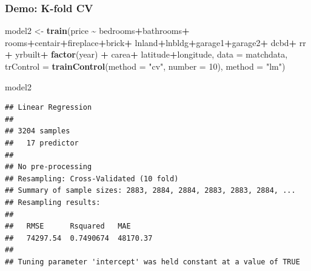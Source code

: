\documentclass[
  shownotes,
  xcolor={svgnames},
  hyperref={colorlinks,citecolor=DarkBlue,linkcolor=DarkRed,urlcolor=DarkBlue}
  , aspectratio=169]{beamer}
\newenvironment{Shaded}{\begin{snugshade}}{\end{snugshade}}
\newcommand{\DataTypeTok}[1]{\textcolor[rgb]{0.13,0.29,0.53}{#1}}
\newcommand{\DecValTok}[1]{\textcolor[rgb]{0.00,0.00,0.81}{#1}}
\newcommand{\KeywordTok}[1]{\textcolor[rgb]{0.13,0.29,0.53}{\textbf{#1}}}
\newcommand{\NormalTok}[1]{#1}
\newcommand{\OperatorTok}[1]{\textcolor[rgb]{0.81,0.36,0.00}{\textbf{#1}}}
\newcommand{\StringTok}[1]{\textcolor[rgb]{0.31,0.60,0.02}{#1}}
\begin{document}
\begin{frame}[fragile]
\frametitle{Demo: K-fold CV}

\begin{scriptsize}
\begin{Shaded}
\begin{Highlighting}[]
\NormalTok{model2 \textless{}{-}}\StringTok{ }\KeywordTok{train}\NormalTok{(price }\OperatorTok{\textasciitilde{}}\StringTok{ }\NormalTok{bedrooms}\OperatorTok{+}\NormalTok{bathrooms}\OperatorTok{+}\StringTok{ }\NormalTok{rooms}\OperatorTok{+}\NormalTok{centair}\OperatorTok{+}\NormalTok{fireplace}\OperatorTok{+}\NormalTok{brick}\OperatorTok{+}
\StringTok{                        }\NormalTok{lnland}\OperatorTok{+}\NormalTok{lnbldg}\OperatorTok{+}\NormalTok{garage1}\OperatorTok{+}\NormalTok{garage2}\OperatorTok{+}
\StringTok{                        }\NormalTok{dcbd}\OperatorTok{+}\StringTok{ }\NormalTok{rr }\OperatorTok{+}
\StringTok{                        }\NormalTok{yrbuilt}\OperatorTok{+}\StringTok{ }\KeywordTok{factor}\NormalTok{(year) }\OperatorTok{+}
\StringTok{                        }\NormalTok{carea}\OperatorTok{+}\StringTok{ }\NormalTok{latitude}\OperatorTok{+}\NormalTok{longitude,}
                        \DataTypeTok{data =}\NormalTok{ matchdata,                        }
                        \DataTypeTok{trControl =} \KeywordTok{trainControl}\NormalTok{(}\DataTypeTok{method =} \StringTok{"cv"}\NormalTok{, }\DataTypeTok{number =} \DecValTok{10}\NormalTok{), }
                        \DataTypeTok{method =} \StringTok{"lm"}\NormalTok{)}
 
\NormalTok{model2}
\end{Highlighting}
\end{Shaded}
\end{scriptsize}
\begin{tiny}
\begin{verbatim}
## Linear Regression 
## 
## 3204 samples
##   17 predictor
## 
## No pre-processing
## Resampling: Cross-Validated (10 fold) 
## Summary of sample sizes: 2883, 2884, 2884, 2883, 2883, 2884, ... 
## Resampling results:
## 
##   RMSE      Rsquared   MAE     
##   74297.54  0.7490674  48170.37
## 
## Tuning parameter 'intercept' was held constant at a value of TRUE
\end{verbatim}
\end{tiny}

\end{frame}
\end{document}
